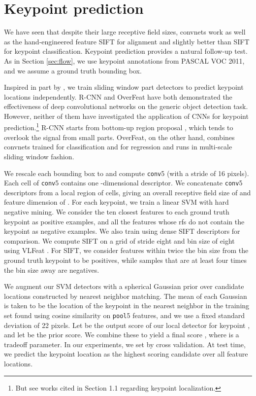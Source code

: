 \documentclass{article} \usepackage{nips14submit_e,times}
\begin{document}
\section{Keypoint prediction}
\label{sec:pred}

We have seen that 
despite their large receptive field sizes, convnets work as well as the hand-engineered
feature SIFT for alignment and slightly better than SIFT for
keypoint classification. Keypoint prediction provides a natural follow-up test.
As in Section \ref{sec:flow}, we use keypoint annotations from PASCAL VOC 2011,
and we assume a ground truth bounding box.



Inspired in part by \cite{RossJeff, overfeat, HumanPoseICLR}, we train sliding
window part detectors to predict keypoint locations independently.  R-CNN
\cite{RossJeff} and OverFeat \cite{overfeat} have both demonstrated the
effectiveness of deep convolutional networks on the generic object detection
task. However, neither of them have investigated the application of CNNs for
keypoint prediction.\footnote{But see works cited in Section 1.1 regarding
keypoint localization.} R-CNN starts from bottom-up region proposal
\cite{selsearch}, which tends to overlook the signal from small parts. OverFeat, on
the other hand, combines convnets trained for classification and
for regression and runs in multi-scale sliding window fashion.

We rescale each bounding box to  and compute \texttt{conv}5
(with a stride of 16 pixels).
Each cell of
\texttt{conv}5 contains one -dimensional descriptor.
We concatenate \texttt{conv}5 descriptors from a local region of  
cells, giving an overall receptive field size of  and feature
dimension of .
For each
keypoint, we train a linear SVM with hard negative mining.
We consider the ten closest features to each ground truth keypoint as positive
examples, and all the features whose rfs do not contain the keypoint as negative
examples.
We also train using dense SIFT descriptors for comparison.
We compute SIFT on a grid of stride eight
 and bin size of eight using VLFeat
\cite{vedaldi08vlfeat}.
For SIFT, we consider features within twice the bin
size from the ground truth keypoint to be positives,
while samples that are at least four times the bin size away are negatives.

We augment our SVM detectors with a spherical Gaussian prior over candidate locations
constructed by nearest neighbor matching.
The mean of each Gaussian is taken to be the location of the keypoint
in the nearest neighbor in the training set found using cosine similarity
on \texttt{pool}5 features, and we use a fixed standard deviation of 22 pixels.
Let  be the output score of our local detector for
keypoint , and let  be the prior score.
We combine these to yield a final score ,
where  is a tradeoff parameter.
In our experiments, we set  by cross validation.
At test time, we predict the keypoint location as the highest scoring candidate
over all feature locations.
\end{document}
